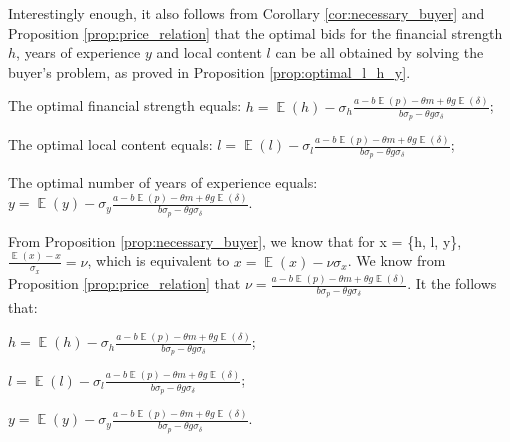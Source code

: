 \documentclass[informs]{informs3}
\begin{document}
Interestingly enough, it also follows from Corollary \ref{cor:necessary_buyer} and Proposition \ref{prop:price_relation} that the optimal bids for the financial strength $h$, years of experience $y$ and local content $l$ can be all obtained by solving the buyer's problem, as proved in Proposition \ref{prop:optimal_l_h_y}.



\begin{proposition}\label{prop:optimal_l_h_y}

	
	The optimal financial strength equals: 	
	$h =\mathop{\mathbb{E}}\left(h\right)-  \sigma_{h} \frac{a-b \mathop{\mathbb{E}}\left(p\right)-\theta m+\theta g \mathop{\mathbb{E}}\left(\delta\right)}{b\sigma_{p}-\theta g\sigma_{\delta}}$;
	
	The optimal local content equals: 	
	$l =\mathop{\mathbb{E}}\left(l\right)-  \sigma_{l} \frac{a-b \mathop{\mathbb{E}}\left(p\right)-\theta m+\theta g \mathop{\mathbb{E}}\left(\delta\right)}{b\sigma_{p}-\theta g\sigma_{\delta}}$;

	The optimal number of years of experience equals:	
	$y =\mathop{\mathbb{E}}\left(y\right)-  \sigma_{y} \frac{a-b \mathop{\mathbb{E}}\left(p\right)-\theta m+\theta g \mathop{\mathbb{E}}\left(\delta\right)}{b\sigma_{p}-\theta g\sigma_{\delta}}$.
	
	
\end{proposition}
%
From Proposition \ref{prop:necessary_buyer}, we know that for x = \{h, l, y\},  $\frac{\mathop{\mathbb{E}}\left(x\right)-x}{\sigma_{x}} = \nu$,  which is equivalent to $x =\mathop{\mathbb{E}}\left(x\right)- \nu \sigma_{x}$. We know from Proposition \ref{prop:price_relation} that $\nu =\frac{a-b \mathop{\mathbb{E}}\left(p\right)-\theta m+\theta g \mathop{\mathbb{E}}\left(\delta\right)}{b\sigma_{p}-\theta g\sigma_{\delta}}$. It the follows that:


$h =\mathop{\mathbb{E}}\left(h\right)-  \sigma_{h} \frac{a-b \mathop{\mathbb{E}}\left(p\right)-\theta m+\theta g \mathop{\mathbb{E}}\left(\delta\right)}{b\sigma_{p}-\theta g\sigma_{\delta}}$;


$l =\mathop{\mathbb{E}}\left(l\right)-  \sigma_{l} \frac{a-b \mathop{\mathbb{E}}\left(p\right)-\theta m+\theta g \mathop{\mathbb{E}}\left(\delta\right)}{b\sigma_{p}-\theta g\sigma_{\delta}}$;

$y =\mathop{\mathbb{E}}\left(y\right)-  \sigma_{y} \frac{a-b \mathop{\mathbb{E}}\left(p\right)-\theta m+\theta g \mathop{\mathbb{E}}\left(\delta\right)}{b\sigma_{p}-\theta g\sigma_{\delta}}$.
\end{document}
